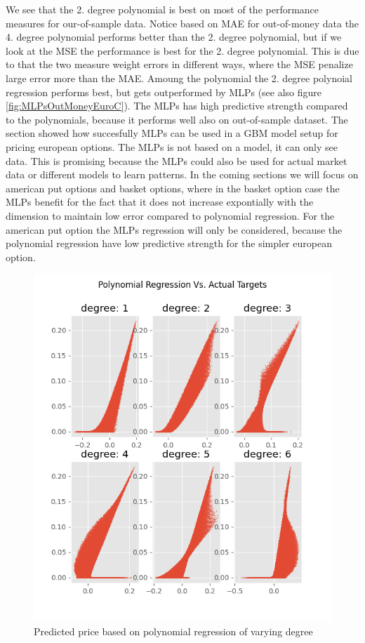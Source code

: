 We see that the 2. degree polynomial is best on most of the performance measures for our-of-sample data. Notice based on MAE for out-of-money data the 4. degree polynomial performs better than the 2. degree polynomial, but if we look at the MSE the performance is best for the 2. degree polynomial. This is due to that the two measure weight errors in different ways, where the MSE penalize large error more than the MAE. Amoung the polynomial the 2. degree polynoial regression performs best, but gets outperformed by MLPs (see also figure \ref{fig:MLPsOutMoneyEuroC}). The MLPs has high predictive strength compared to the polynomials, because it performs well also on out-of-sample dataset. The section showed how succesfully MLPs can be used in a GBM model setup for pricing european options. The MLPs is not based on a model, it can only see data. This is promising because the MLPs could also be used for actual market data or different models to learn patterns. In the coming sections we will focus on american put options and basket options, where in the basket option case the MLPs benefit for the fact that it does not increase expontially with the dimension to maintain low error compared to polynomial regression. For the american put option the MLPs regression will only be considered, because the polynomial regression have low predictive strength for the simpler european option.

\begin{figure}[H]
\centering
\includegraphics{Figures/polynomialOutMoneyEuroC.png}
\decoRule
\caption[Polynomial Regression Predictions Vs. Actual Prices]{Predicted price based on polynomial regression of varying degree}
\label{fig:PolynomialOutMoneyEuroC}
\end{figure}

